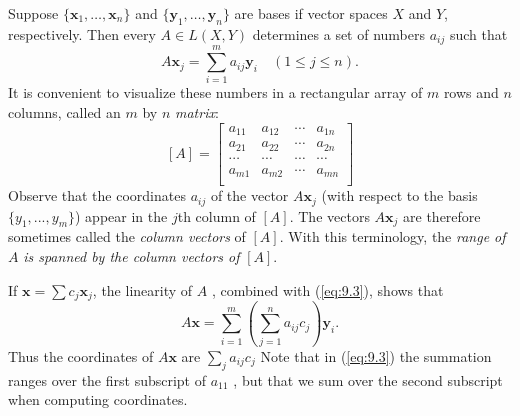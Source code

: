 \begin{mydef}
    Suppose $\{\mathbf{x}_1, \dots , \mathbf{x}_n\}$ 
    and $\{\mathbf{y}_1, \dots , \mathbf{y}_n\}$ are bases if vector spaces $X$ and $Y$, respectively.
    Then every $A \in L(X, Y)$ determines a set of numbers $a_{ij}$ such that 
    \begin{equation}
        \label{eq:9.3}
        A \mathbf{x}_j = 
        \sum_{i=1}^{m} a_{ij} \mathbf{y}_i
        \quad 
        (1 \leq j \leq n).
    \end{equation}
    It is convenient to visualize these numbers in a rectangular array of $m$ rows and $n$ columns, called an $m$ by $n$ \emph{matrix}:
    \begin{equation*}
        \left[ A \right] = 
        \begin{bmatrix}
            a_{11} & a_{12} & \cdots & a_{1n} \\
            a_{21} & a_{22} & \cdots & a_{2n} \\
            \cdots & \cdots & \cdots & \cdots \\
            a_{m1} & a_{m2} & \cdots & a_{mn} \\
        \end{bmatrix}
    \end{equation*}
    Observe that the coordinates $a_{ij}$ of the vector $A \mathbf{x}_j$ 
    (with respect to the basis $\{y_1, ... , y_m\}$) appear in the $j$th column of $[A]$. 
    The vectors $A \mathbf{x}_j$ are therefore sometimes called the \emph{column vectors} of $[A]$. 
    With this terminology, the \emph{range of} $A$ \emph{is spanned by the column vectors of} $[A]$.

    If $\mathbf{x} = \sum c_j \mathbf{x}_j$, the linearity of $A$ , combined with (\ref{eq:9.3}), shows that 
    \begin{equation}
        \label{eq:9.4}
        A \mathbf{x} = 
        \sum_{i=1}^{m} \left( 
            \sum_{j=1}^{n} a_{ij} c_j
         \right) 
         \mathbf{y}_i .
    \end{equation}
    Thus the coordinates of $A \mathbf{x}$ are $\sum_j a_{ij} c_j$ 
    Note that in (\ref{eq:9.3}) the summation ranges over the first subscript of $a_{11}$ , 
    but that we sum over the second subscript when computing coordinates.


\end{mydef}

